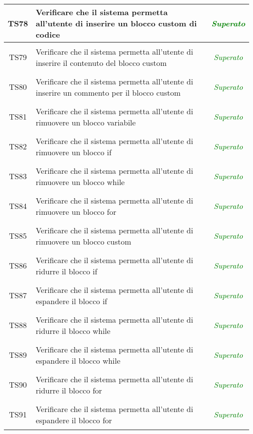 \begin{longtable}{|c|>{}m{8cm}|c|}
\hypertarget{TS4.6}{TS78} & Verificare che il sistema permetta all'utente di inserire un blocco custom di codice & \textcolor{Green}{\textit{Superato}}\\ \hline
\hypertarget{TS4.6.1}{TS79} & Verificare che il sistema permetta all'utente di inserire il contenuto del blocco custom & \textcolor{Green}{\textit{Superato}}\\ \hline
\hypertarget{TS4.6.2}{TS80} & Verificare che il sistema permetta all'utente di inserire un commento per il blocco custom & \textcolor{Green}{\textit{Superato}}\\ \hline
\hypertarget{TS4.7}{TS81} & Verificare che il sistema permetta all'utente di rimuovere un blocco variabile & \textcolor{Green}{\textit{Superato}}\\ \hline
\hypertarget{TS4.9}{TS82} & Verificare che il sistema permetta all'utente di rimuovere un blocco if & \textcolor{Green}{\textit{Superato}}\\ \hline
\hypertarget{TS4.10}{TS83} & Verificare che il sistema permetta all'utente di rimuovere un blocco while & \textcolor{Green}{\textit{Superato}}\\ \hline
\hypertarget{TS4.11}{TS84} & Verificare che il sistema permetta all'utente di rimuovere un blocco for & \textcolor{Green}{\textit{Superato}}\\ \hline
\hypertarget{TS4.12}{TS85} & Verificare che il sistema permetta all'utente di rimuovere un blocco custom & \textcolor{Green}{\textit{Superato}}\\ \hline
\hypertarget{TS4.13}{TS86} & Verificare che il sistema permetta all'utente di ridurre il blocco if & \textcolor{Green}{\textit{Superato}}\\ \hline
\hypertarget{TS4.14}{TS87} & Verificare che il sistema permetta all'utente di espandere il blocco if & \textcolor{Green}{\textit{Superato}}\\ \hline
\hypertarget{TS4.15}{TS88} & Verificare che il sistema permetta all'utente di ridurre il blocco while & \textcolor{Green}{\textit{Superato}}\\ \hline
\hypertarget{TS4.16}{TS89} & Verificare che il sistema permetta all'utente di espandere il blocco while & \textcolor{Green}{\textit{Superato}}\\ \hline
\hypertarget{TS4.17}{TS90} & Verificare che il sistema permetta all'utente di ridurre il blocco for & \textcolor{Green}{\textit{Superato}}\\ \hline
\hypertarget{TS4.18}{TS91} & Verificare che il sistema permetta all'utente di espandere il blocco for & \textcolor{Green}{\textit{Superato}}\\ \hline

\end{longtable}
